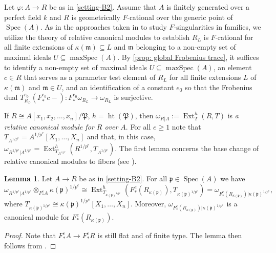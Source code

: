 \documentclass[reqno,11pt]{amsart}
\numberwithin{equation}{section}
\theoremstyle{definition}
\theoremstyle{definition}
\newtheorem{lemma}[theorem]{Lemma}
\theoremstyle{definition}
\theoremstyle{remark}
\newcommand{\Spec}{\operatorname{Spec}}
\newcommand{\maxSpec}{\operatorname{maxSpec}}
\newcommand{\Height}{\operatorname{ht}}
\newcommand{\Ext}{\operatorname{Ext}}
\newcommand{\fm}{\mathfrak{m}}
\newcommand{\fp}{\mathfrak{p}}
\newcommand{\fP}{\mathfrak{P}}
\begin{document}
Let $\varphi\colon A\to R$ be as in \cref{setting-B2}. Assume that $A$ is finitely generated over a perfect field $k$ and $R$ is geometrically $F$-rational over the generic point of $\Spec(A)$. As in the approaches taken in \cite{PSZ18} to study $F$-singularities in families, we utilize the theory of relative canonical modules to establish $R_{L}$ is $F$-rational for all finite extensions of $\kappa(\fm)\subseteq L$ and $\fm$ belonging to a non-empty set of maximal ideals $U\subseteq \maxSpec(A)$. By \cref{prop: global Frobenius trace}, it suffices to identify a non-empty set of maximal ideals $U\subseteq \maxSpec(A)$, an element $c\in R$ that serves as a parameter test element of $R_{L}$ for all finite extensions $L$ of $\kappa(\fm)$ and $\fm\in U$, and an identification of a constant $e_0$ so that the Frobenius dual $T^{e_0}_{R_{L}}(F^{e_0}_*c-)\colon F^{e_0}_*\omega_{R_{L}}\to \omega_{R_{L}}$ is surjective.

If $R\cong A[x_1,x_2,\ldots,x_n]/\fP$, $h=\Height(\fP)$, then $\omega_{R|A} := \Ext^h_T(R,T)$ is \emph{a relative canonical module for $R$ over $A$}. For all $e \geq 1$ note that $T_{A^{1/p^e}}=A^{1/p^e}[X_1,\ldots,X_n]$ and that, in this case, $\omega_{R^{1/p^e}|A^{1/p^e}} = \Ext^h_{T_{A^{1/p^e}}}(R^{1/p^e},T_{A^{1/p^e}})$. The first lemma concerns the base change of relative canonical modules to fibers (see \cite[\href{https://stacks.math.columbia.edu/tag/0E9M}{Tag 0E9M}]{stacks-project}).

\begin{lemma} \label{lemma base change} Let $A \to R$ be as in \cref{setting-B2}. For all $\fp \in \Spec(A)$ we have
\[
\omega_{R^{1/p^e}|A^{1/p^e}} \otimes_{F^e_*A} \kappa(\fp)^{1/p^e} \cong \Ext^h_{T_{\kappa(\fp)^{1/p^e}}}(F^e_*(R_{\kappa(\fp)}),T_{\kappa(\fp)^{1/p^e}}) = \omega_{F^e_*(R_{\kappa(\fp)})|\kappa(\fp)^{1/p^e}},
\]
where $T_{\kappa(\fp)^{1/p^e}} \cong \kappa(\fp)^{1/p^e}[X_1,\ldots,X_n]$. Moreover, $\omega_{F^e_*(R_{\kappa(\fp)})|\kappa(\fp)^{1/p^e}}$ is a canonical module for $F^e_*(R_{\kappa(\fp)})$.
\end{lemma}
\begin{proof}
    Note that $F^e_*A\to F^e_*R$ is still flat and of finite type. The lemma then follows from \cite[Tags \href{https://stacks.math.columbia.edu/tag/0BZV}{0BZV} and \href{https://stacks.math.columbia.edu/tag/0BZW}{0BZW}]{stacks-project}.
\end{proof}
\end{document}
